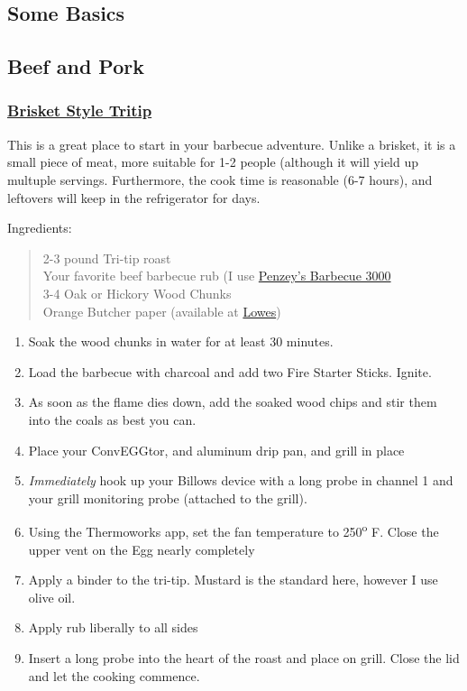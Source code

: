 \documentclass[
]{book}
\providecommand{\tightlist}{%
  \setlength{\itemsep}{0pt}\setlength{\parskip}{0pt}}
\begin{document}
\hypertarget{some-basics}{%
\subsection{Some Basics}\label{some-basics}}

\hypertarget{beef-and-pork}{%
\subsection{Beef and Pork}\label{beef-and-pork}}

\hypertarget{tritip}{%
\subsubsection{\texorpdfstring{\href{https://blog.thermoworks.com/beef/brisket-style-tri-tip/}{Brisket Style Tritip}}{Brisket Style Tritip}}\label{tritip}}

This is a great place to start in your barbecue adventure. Unlike a brisket, it is a small piece of meat, more suitable for 1-2 people (although it will yield up multuple servings. Furthermore, the cook time is reasonable (6-7 hours), and leftovers will keep in the refrigerator for days.

Ingredients:

\begin{quote}
2-3 pound Tri-tip roast\\
Your favorite beef barbecue rub (I use \href{https://www.penzeys.com/online-catalog/bbq-3000/c-24/p-327/pd-s}{Penzey's Barbecue 3000}\\
3-4 Oak or Hickory Wood Chunks\\
Orange Butcher paper (available at \href{http://www.lowes.com}{Lowes})
\end{quote}

\begin{enumerate}
\def\labelenumi{\arabic{enumi}.}
\tightlist
\item
  Soak the wood chunks in water for at least 30 minutes.
\item
  Load the barbecue with charcoal and add two Fire Starter Sticks. Ignite.
\item
  As soon as the flame dies down, add the soaked wood chips and stir them into the coals as best you can.
\item
  Place your ConvEGGtor, and aluminum drip pan, and grill in place
\item
  \emph{Immediately} hook up your Billows device with a long probe in channel 1 and your grill monitoring probe (attached to the grill).\\
\item
  Using the Thermoworks app, set the fan temperature to 250\textsuperscript{o} F. Close the upper vent on the Egg nearly completely
\item
  Apply a binder to the tri-tip. Mustard is the standard here, however I use olive oil.
\item
  Apply rub liberally to all sides
\item
  Insert a long probe into the heart of the roast and place on grill. Close the lid and let the cooking commence.
\end{enumerate}
\end{document}
